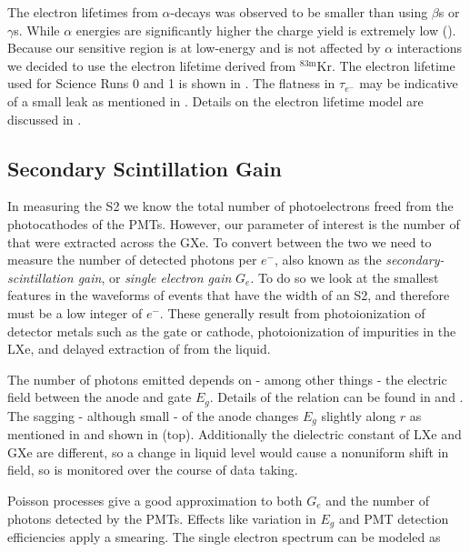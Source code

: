 The electron lifetimes from $\alpha$-decays was observed to be smaller than using $\beta$s or $\gamma$s.  While $\alpha$ energies are
significantly higher the charge yield is extremely low ().  Because our sensitive region is at
low-energy and is not affected by $\alpha$ interactions we decided to use the electron lifetime derived from $\mathrm{^{83m}Kr}$.  The
electron lifetime used for Science Runs 0 and 1 is shown in .  The flatness in $\tau_{e^-}$
may be indicative of a small leak as mentioned in .  Details on the electron
lifetime model are discussed in .



\subsection{Secondary Scintillation Gain}
\label{subsec:det_char_single_electron_gain}
In measuring the S2 we know the total number of photoelectrons freed from the photocathodes of the PMTs.  However, our parameter of
interest is the number of \electron that were extracted across the GXe.  To convert between the two we need to measure the number of
detected photons per $e^-$, also known as the \textit{secondary-scintillation gain}, or \textit{single electron gain} $G_e$.  To do so we
look at the
smallest features in the waveforms of events that have the width of an S2, and therefore must be a low integer of $e^-$.  These generally
result
from photoionization of detector metals such as the gate or cathode, photoionization of impurities in the LXe, and delayed extraction
of \electron from the liquid.

The number of photons emitted depends on - among other things - the electric field between the anode and gate $E_g$.  Details of the
relation can be found in  and .  The sagging - although small - of the
anode changes $E_g$ slightly along $r$ as mentioned in  and shown in
 (top).  Additionally the dielectric constant of LXe and GXe are different, so a change in liquid level
would cause a nonuniform shift in field, so is monitored over the course of data taking.

Poisson processes give a good approximation to both $G_e$ and the number of photons detected by the PMTs.  Effects like variation in $E_g$
and PMT detection efficiencies apply a smearing.  The single electron spectrum can be modeled as

